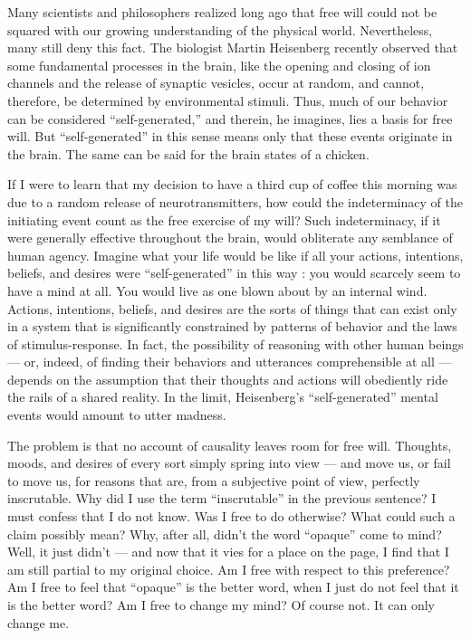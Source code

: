 \documentclass[a4paper,14pt]{extarticle}
\begin{document}
Many scientists and philosophers realized long ago that free will could not be squared with our growing understanding of the physical world.
Nevertheless, many still deny this fact.
The biologist Martin Heisenberg recently observed that some fundamental processes in the brain, like the opening and closing of ion channels and the release of synaptic vesicles, occur at random, and cannot, therefore, be determined by environmental stimuli.
Thus, much of our behavior can be considered ``self-generated,'' and therein, he imagines, lies a basis for free will.
But ``self-generated'' in this sense means only that these events originate in the brain.
The same can be said for the brain states of a chicken.

If I were to learn that my decision to have a third cup of coffee this morning was due to a random release of neurotransmitters, how could the indeterminacy of the initiating event count as the free exercise of my will?
Such indeterminacy, if it were generally effective throughout the brain, would obliterate any semblance of human agency.
Imagine what your life would be like if all your actions, intentions, beliefs, and desires were ``self-generated'' in this way :
you would scarcely seem to have a mind at all.
You would live as one blown about by an internal wind.
Actions, intentions, beliefs, and desires are the sorts of things that can exist only in a system that is significantly constrained by patterns of behavior and the laws of stimulus-response.
In fact, the possibility of reasoning with other human beings --- or, indeed, of finding their behaviors and utterances comprehensible at all --- depends on the assumption that their thoughts and actions will obediently ride the rails of a shared reality.
In the limit, Heisenberg’s ``self-generated'' mental events would amount to utter madness.

The problem is that no account of causality leaves room for free will.
Thoughts, moods, and desires of every sort simply spring into view --- and move us, or fail to move us, for reasons that are, from a subjective point of view, perfectly inscrutable.
Why did I use the term ``inscrutable'' in the previous sentence?
I must confess that I do not know.
Was I free to do otherwise?
What could such a claim possibly mean?
Why, after all, didn’t the word ``opaque'' come to mind?
Well, it just didn’t --- and now that it vies for a place on the page, I find that I am still partial to my original choice.
Am I free with respect to this preference?
Am I free to feel that ``opaque'' is the better word, when I just do not feel that it is the better word?
Am I free to change my mind?
Of course not.
It can only change me.
\end{document}
